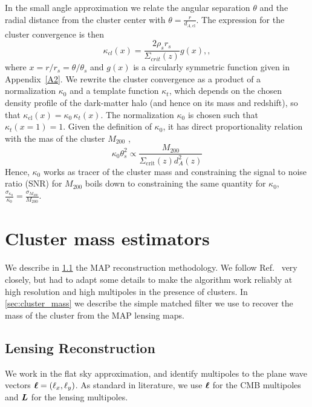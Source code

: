 \documentclass[prd, superscriptaddress, tightenlines, longbibliography, nofootinbib, eqsecnum, amsfonts, amsmath, floatfix, twocolumn, notitlepage]{revtex4-2}
\begin{document}
In the small angle approximation we relate the angular separation $\theta$ and the radial distance from the cluster center with $\theta = \frac{r}{d_{A,\text{cl}}}$.
The expression for the cluster convergence is then
\begin{equation}
    \kappa_{cl} (x) = \frac{2\rho_s r_s}{\Sigma_{crit}(z)}g(x), ,
\end{equation}
where  $x= r / r_s = \theta / \theta_s$ and $g(x)$ is a circularly symmetric function given in Appendix~\ref{A2}. 
We rewrite the cluster convergence as a product of a normalization $\kappa_0$ and a template function $\kappa_t$, which depends on the chosen density profile of the dark-matter halo (and hence on its mass and redshift), so that $\kappa_{\text{cl}} (x) = \kappa_0 \, \kappa_t (x)$.
The normalization $\kappa_0$ is chosen such that $\kappa_t(x=1) = 1$.
Given the definition of $\kappa_0$, it has direct proportionality relation with the mas of the cluster $M_{200}$ \cite{Zubeldia:2019brr},
\begin{equation}\label{eq:tracer}
    \kappa_0 \theta_s^2 \propto \frac{M_{200}}{\Sigma_{\text{crit}}(z)d_{A}^2(z)}
\end{equation}
Hence, $\kappa_0$ works as tracer of the cluster mass and constraining the signal to noise ratio (SNR) for $M_{200}$ boils down to constraining the same quantity for $\kappa_0$, $\displaystyle \frac{\sigma_{\kappa_0}}{\kappa_0} = \frac{\sigma_{M_{200}}}{M_{200}}$. 

 

\section{Cluster mass estimators}
\label{sec:method}
We describe in \ref{sec:estimators} the MAP reconstruction methodology. We follow  Ref.~\cite{Carron:2017mqf} very closely, but had to adapt some details to make the algorithm work reliably at high resolution and high multipoles in the presence of clusters.
In \ref{sec:cluster_mass} we describe the simple matched filter we use to recover the mass of the cluster from the MAP lensing maps.

\subsection{Lensing Reconstruction}
\label{sec:estimators}


We work in the flat sky approximation, and identify multipoles to the plane wave vectors ${\boldsymbol{\ell}} = (\ell_x, \ell_y)$.
As standard in literature, we use ${\boldsymbol{\ell}}$ for the CMB multipoles and ${\mbox{\boldmath{$L$}}}$ for the lensing multipoles.   
\end{document}
